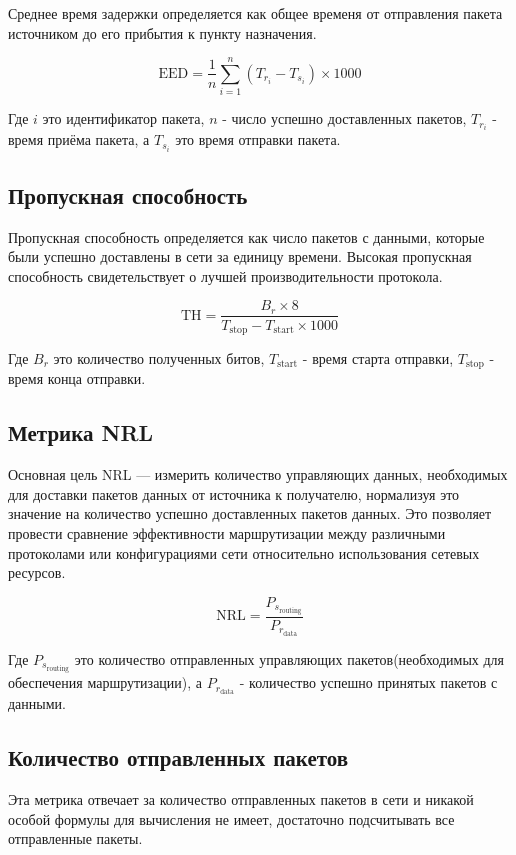 Среднее время задержки определяется как общее временя от отправления пакета источником до его прибытия к пункту назначения.

\begin{equation}
  \label{eq:delay_calculation}
  \text{EED} = \frac{1}{n} \sum_{i=1}^{n}(T_{r_i} - T_{s_i}) \times 1000
\end{equation}

Где $i$ это идентификатор пакета, $n$ - число успешно доставленных пакетов, $T_{r_i}$ - время приёма пакета, а $T_{s_i}$ это время отправки пакета. 

\subsection*{Пропускная способность}

Пропускная способность определяется как число пакетов с данными, которые были успешно доставлены в сети за единицу времени. Высокая пропускная способность свидетельствует о лучшей производительности протокола.

\begin{equation}
  \label{eq:throughput_calculation}
  \text{TH} = \frac{B_r \times 8}{T_{\text{stop}} - T_{\text{start}} \times 1000}
\end{equation}

Где $B_r$ это количество полученных битов, $T_{\text{start}}$ - время старта отправки, $T_{\text{stop}}$ - время конца отправки.

\subsection*{Метрика NRL} 

Основная цель NRL — измерить количество управляющих данных, необходимых для доставки пакетов данных от источника к получателю, нормализуя это значение на количество успешно доставленных пакетов данных. Это позволяет провести сравнение эффективности маршрутизации между различными протоколами или конфигурациями сети относительно использования сетевых ресурсов.

\begin{equation}
  \label{eq:nrl_calculation}
  \text{NRL} = \frac{P_{s_{\text{routing}}}}{P_{r_{\text{data}}}}
\end{equation}

Где $P_{s_{\text{routing}}}$ это количество отправленных управляющих пакетов(необходимых для обеспечения маршрутизации), а $P_{r_{\text{data}}}$ - количество успешно принятых пакетов с данными.

\subsection*{Количество отправленных пакетов}

Эта метрика отвечает за количество отправленных пакетов в сети и никакой особой формулы для вычисления не имеет, достаточно подсчитывать все отправленные пакеты.

